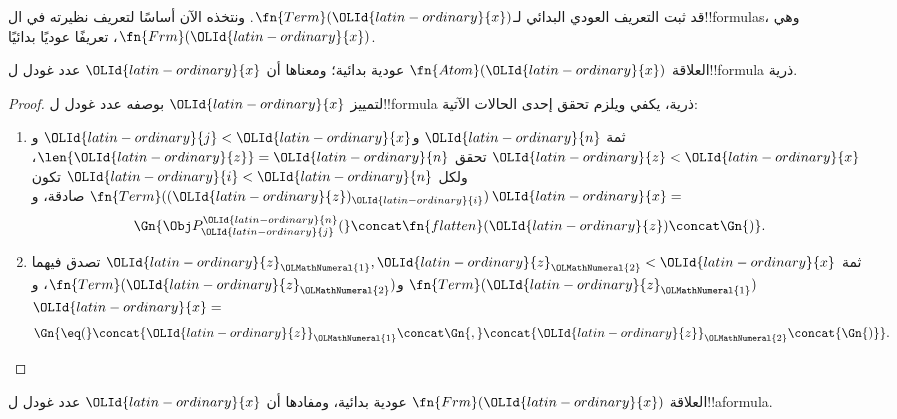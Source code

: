 \documentclass[../../../include/open-logic-section]{subfiles}
\begin{document}

قد ثبت التعريف العودي البدائي لـ$\fn{Term}({\OLId{latin-ordinary}{x}})$.
ونتخذه الآن أساسًا لتعريف نظيرته في
ال!!{formula}s، وهي $\fn{Frm}({\OLId{latin-ordinary}{x}})$،
تعريفًا عوديًا بدائيًا.

\begin{prop}
العلاقة $\fn{Atom}({\OLId{latin-ordinary}{x}})$ عودية بدائية؛ ومعناها أن ${\OLId{latin-ordinary}{x}}$
عدد غودل ل!!{formula} ذرية.
\end{prop}

\begin{proof}
لتمييز ${\OLId{latin-ordinary}{x}}$ بوصفه عدد غودل ل!!{formula} ذرية،
يكفي ويلزم تحقق إحدى الحالات الآتية:
\begin{enumerate}
\item ثمة ${\OLId{latin-ordinary}{n}}$ و${\OLId{latin-ordinary}{j}}<{\OLId{latin-ordinary}{x}}$ و${\OLId{latin-ordinary}{z}}<{\OLId{latin-ordinary}{x}}$ تحقق $\len{{\OLId{latin-ordinary}{z}}}={\OLId{latin-ordinary}{n}}$، ولكل ${\OLId{latin-ordinary}{i}}<{\OLId{latin-ordinary}{n}}$ تكون
  $\fn{Term}(({\OLId{latin-ordinary}{z}})_{\OLId{latin-ordinary}{i}})$ صادقة، و${\OLId{latin-ordinary}{x}}=$
\[
\Gn{\Obj P^{\OLId{latin-ordinary}{n}}_{\OLId{latin-ordinary}{j}}(} \concat \fn{flatten}({\OLId{latin-ordinary}{z}}) \concat \Gn{)}.
\]
\item ثمة ${\OLId{latin-ordinary}{z}}_{\OLMathNumeral{1}},{\OLId{latin-ordinary}{z}}_{\OLMathNumeral{2}}<{\OLId{latin-ordinary}{x}}$ تصدق فيهما $\fn{Term}({\OLId{latin-ordinary}{z}}_{\OLMathNumeral{1}})$ و$\fn{Term}({\OLId{latin-ordinary}{z}}_{\OLMathNumeral{2}})$،
  و${\OLId{latin-ordinary}{x}}=$
\[
\Gn{{\eq}(} \concat {\OLId{latin-ordinary}{z}}_{\OLMathNumeral{1}} \concat \Gn{,} \concat {\OLId{latin-ordinary}{z}}_{\OLMathNumeral{2}} \concat{\Gn{)}}.
\]
\end{enumerate}
\end{proof}

\begin{prop}
العلاقة $\fn{Frm}({\OLId{latin-ordinary}{x}})$ عودية بدائية، ومفادها أن ${\OLId{latin-ordinary}{x}}$
عدد غودل ل!!a{formula}.
\end{prop}
\end{document}
